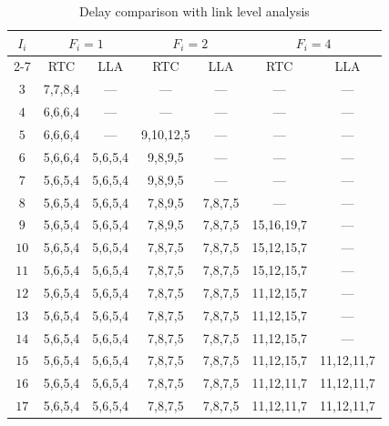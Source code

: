 \documentclass[10pt,journal]{IEEEtran}
\begin{document}
\begin{table}[htbp]
\centering
\caption{\label{LLAvsRTC}Delay comparison with link level analysis}
\begin{tabular}{|c|c|c|c|c|c|c|}
\hline
\multirow{3}{*}{$I_i$}  & \multicolumn{2}{|c|}{$F_i=1$} & \multicolumn{2}{|c|}{$F_i=2$}    &   \multicolumn{2}{|c|}{$F_i=4$} \\
\cline{2-7}
& RTC & LLA & RTC & LLA &   RTC &   LLA\\
\hline
$3$ &   7,7,8,4 &   --- &   --- &   ---   &      --- &   --- \\
\hline
$4$ &   6,6,6,4 &   --- &   --- &   ---   &      --- &   --- \\
\hline
$5$ &   6,6,6,4 &   --- &   9,10,12,5 &   ---   &      --- &   --- \\
\hline
$6$ &   5,6,6,4 &   5,6,5,4 &   9,8,9,5 &   ---   &      --- &   --- \\
\hline
$7$ &   5,6,5,4 &   5,6,5,4 &   9,8,9,5 &   --- &      --- &   --- \\
\hline
$8$ &   5,6,5,4 &   5,6,5,4 &   7,8,9,5 &   7,8,7,5 &      --- &   --- \\
\hline
$9$ &   5,6,5,4 &   5,6,5,4 &   7,8,9,5 &   7,8,7,5 &   15,16,19,7 &   --- \\
\hline
$10$    &   5,6,5,4 &   5,6,5,4 &   7,8,7,5 &   7,8,7,5 &   15,12,15,7  &   ---\\
\hline
$11$    &   5,6,5,4 &   5,6,5,4 &   7,8,7,5 &   7,8,7,5 &   15,12,15,7  &   ---\\
\hline
$12$    &   5,6,5,4 &   5,6,5,4 &   7,8,7,5 &   7,8,7,5 &   11,12,15,7  &   ---\\
\hline
$13$    &   5,6,5,4 &   5,6,5,4 &   7,8,7,5 &   7,8,7,5 &   11,12,15,7  &   ---\\
\hline
$14$    &   5,6,5,4 &   5,6,5,4 &   7,8,7,5 &   7,8,7,5 &   11,12,15,7  &   ---\\
\hline
$15$    &   5,6,5,4 &   5,6,5,4 &   7,8,7,5 &   7,8,7,5 &   11,12,15,7  &   11,12,11,7\\
\hline
$16$    &   5,6,5,4 &   5,6,5,4 &   7,8,7,5 &   7,8,7,5 &   11,12,11,7  &   11,12,11,7\\
\hline
$17$    &   5,6,5,4 &   5,6,5,4 &   7,8,7,5 &   7,8,7,5 &   11,12,11,7  &   11,12,11,7\\
\hline
\end{tabular}
\end{table}
\end{document}
